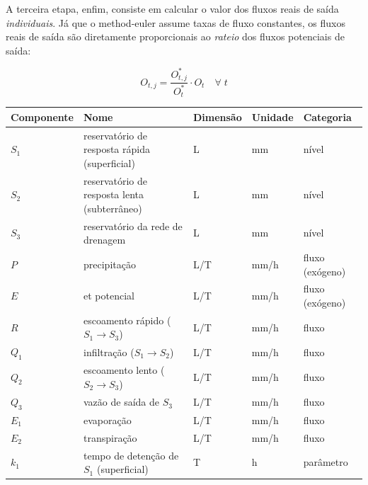 \documentclass[./main.tex]{subfiles}
\begin{document}
A terceira etapa, enfim, consiste em calcular o valor dos fluxos reais de saída \textit{individuais}. Já que o \gls{method-euler} assume taxas de fluxo constantes, os fluxos reais de saída são diretamente proporcionais ao \textit{rateio} dos fluxos potenciais de saída:
\begin{linenomath*}
\begin{equation} 
	\label{eq:simult_3}
 O_{t, j} = \frac{O^*_{t, j}}{O^*_t} \cdot O_{t} \quad \forall\;t
\end{equation}
\end{linenomath*}

{\renewcommand{\arraystretch}{1.5}%
\begin{table}[t!]
    \centering	
    \tiny
    \sffamily
    \begin{tabular}{ 
        >{\raggedright\arraybackslash}m{1cm}  
        >{\raggedright\arraybackslash}m{6cm}  
        >{\raggedright\arraybackslash}m{1cm}
        >{\raggedright\arraybackslash}m{1cm}
        >{\raggedright\arraybackslash}m{2cm}}
        \toprule
        \textbf{Componente} & \textbf{Nome} & \textbf{Dimensão} & \textbf{Unidade} & \textbf{Categoria} \\ 
        \midrule
        $S_1$ & reservatório de resposta rápida (superficial) & L & mm & nível \\ 
        $S_2$ & reservatório de resposta lenta (subterrâneo) & L & mm & nível \\ 
        $S_3$ & reservatório da rede de drenagem & L & mm & nível \\ 
        $P$ & precipitação & L/T & mm/h & fluxo (exógeno)\\
        $E$ & \acrlong{et} potencial & L/T & mm/h & fluxo (exógeno)\\ 
        $R$ & escoamento rápido ($S_1 \rightarrow S_3$) & L/T & mm/h & fluxo\\ 
        $Q_1$ & infiltração ($S_1 \rightarrow S_2$) & L/T & mm/h & fluxo\\ 
        $Q_2$ & escoamento lento ($S_2 \rightarrow S_3$) & L/T & mm/h & fluxo\\ 
        $Q_3$ & vazão de saída de $S_3$ & L/T & mm/h & fluxo\\ 
        $E_1$ & evaporação & L/T & mm/h & fluxo\\ 
        $E_2$ & transpiração & L/T & mm/h & fluxo\\ 
        $k_1$ & tempo de detenção de $S_1$ (superficial) & T & h & parâmetro \\ 

\end{tabular}
\end{table}}
\end{document}
